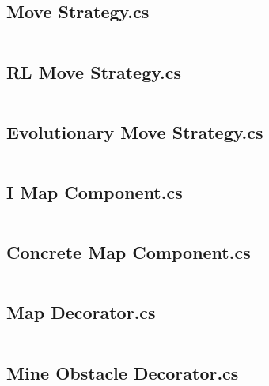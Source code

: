 	\newpage
	
	\subsection{Move Strategy.cs}
	\inputminted[linenos=true,fontsize=\footnotesize,tabsize=2]{csharp}{../Battleship/Battleship/Move_Strategy.cs}
	
	\newpage
	
	\subsection{RL Move Strategy.cs}
	\inputminted[linenos=true,fontsize=\footnotesize,tabsize=2]{csharp}{../Battleship/Battleship/RL_Move_Strategy.cs}
	
	\newpage
	
	\subsection{Evolutionary Move Strategy.cs}
	\inputminted[linenos=true,fontsize=\footnotesize,tabsize=2]{csharp}{../Battleship/Battleship/Evolutionary_Move_Strategy.cs}
	
	\newpage
	
	\subsection{I Map Component.cs}
	\inputminted[linenos=true,fontsize=\footnotesize,tabsize=2]{csharp}{../Battleship/Battleship/I_Map_Component.cs}
	
	\newpage
	
	\subsection{Concrete Map Component.cs}
	\inputminted[linenos=true,fontsize=\footnotesize,tabsize=2]{csharp}{../Battleship/Battleship/Concrete_Map_Component.cs}
	
	\newpage
	
	\subsection{Map Decorator.cs}
	\inputminted[linenos=true,fontsize=\footnotesize,tabsize=2]{csharp}{../Battleship/Battleship/Map_Decorator.cs}
	
	\newpage
	
	\subsection{Mine Obstacle Decorator.cs}
	\inputminted[linenos=true,fontsize=\footnotesize,tabsize=2]{csharp}{../Battleship/Battleship/Mine_Obstacle_Decorator.cs}
	
